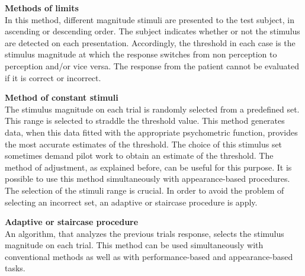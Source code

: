 \textbf{Methods of limits} 
\\
In this method, different magnitude stimuli are presented to the test subject, in ascending or descending order. The subject indicates whether or not the stimulus are detected on each presentation. Accordingly, the threshold in each case is the stimulus magnitude at which the response switches from non perception to perception and/or vice versa. The response from the patient cannot be evaluated if it is correct or incorrect. \cite{Kingdom2016}


\textbf{Method of constant stimuli}
\\
The stimulus magnitude on each trial is randomly selected from a predefined set. This range is selected to straddle the threshold value. This method generates data, when this data fitted with the appropriate psychometric function, provides the most accurate estimates of the threshold. The choice of this stimulus set sometimes demand pilot work to obtain an estimate of the threshold. The method of adjustment, as explained before, can be useful for this purpose. It is possible to use this method simultaneously with appearance-based procedures. The selection of the stimuli range is crucial. In order to avoid the problem of selecting an incorrect set, an adaptive or staircase procedure is apply.

\textbf{Adaptive or staircase procedure}
\\
An algorithm, that analyzes the previous trials response, selects the stimulus magnitude on each trial. This method can be used simultaneously  with conventional methods as well as with performance-based and appearance-based tasks.

